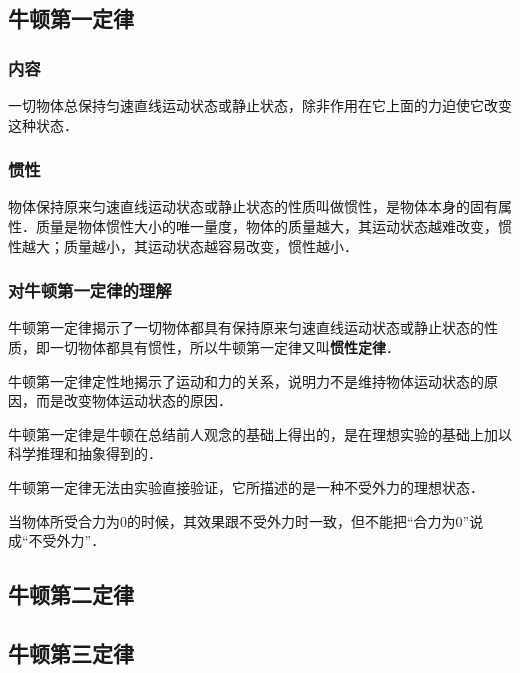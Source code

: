 
\begin{issues}
\issueDraft
\issueTODO
\end{issues}


\subsection{牛顿第一定律}
\subsubsection{内容}
一切物体总保持匀速直线运动状态或静止状态，除非作用在它上面的力迫使它改变这种状态．

\subsubsection{惯性}
物体保持原来匀速直线运动状态或静止状态的性质叫做惯性，是物体本身的固有属性．质量是物体惯性大小的唯一量度，物体的质量越大，其运动状态越难改变，惯性越大；质量越小，其运动状态越容易改变，惯性越小．

\subsubsection{对牛顿第一定律的理解}
牛顿第一定律揭示了一切物体都具有保持原来匀速直线运动状态或静止状态的性质，即一切物体都具有惯性，所以牛顿第一定律又叫\textbf{惯性定律}．

牛顿第一定律定性地揭示了运动和力的关系，说明力不是维持物体运动状态的原因，而是改变物体运动状态的原因．

牛顿第一定律是牛顿在总结前人观念的基础上得出的，是在理想实验的基础上加以科学推理和抽象得到的．

牛顿第一定律无法由实验直接验证，它所描述的是一种不受外力的理想状态．

当物体所受合力为0的时候，其效果跟不受外力时一致，但不能把“合力为0”说成“不受外力”．

\subsection{牛顿第二定律}

\subsection{牛顿第三定律}